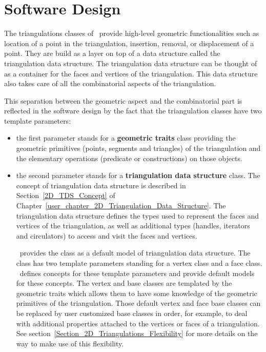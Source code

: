 \section{Software Design\label{Section_2D_Triangulations_Software_Design}}

The triangulations  classes of \cgal\  
provide high-level geometric functionalities
such as location of a point in the triangulation, insertion, removal, or displacement of a point.
They are build as a layer on top of a data structure
called the triangulation data structure.
The triangulation data structure   can be thought 
of as a container for the faces and vertices of the triangulation.
This data structure  also takes care
of all the combinatorial aspects of the triangulation.

This separation between the
geometric aspect and the combinatorial part
is reflected in the software design by the fact
that the triangulation classes have two template parameters:

\begin{itemize}
\item {} the first parameter stands for a
\textbf{geometric traits} class providing 
the geometric primitives (points, segments and triangles) 
of  the triangulation and the elementary
operations (predicate or constructions) on those objects.

\item {} the second parameter stands for a
\textbf{triangulation data structure} class. The concept
of triangulation data structure is described in
 Section~\ref{2D_TDS_Concept} of
Chapter~\ref{user_chapter_2D_Triangulation_Data_Structure}.
The triangulation data structure defines the types
used to represent the faces and vertices of the triangulation,
as well as additional types (handles, iterators and circulators)
to access and visit the faces and vertices.

\cgal\ provides the class 
as a  default model of triangulation data structure.
The class \ccc{Triangulation_data_structure_2<Vb,Fb>}
has two template parameters standing for
a vertex class and a face class.
\cgal\ defines concepts 
for these template parameters
and provide default models for these concepts.
The vertex and base classes are templated by the geometric
traits which allows them to have some knowledge of the geometric
primitives of the triangulation. 
Those default vertex and  face base classes
can be replaced by 
user customized base classes in order, for example, to deal
with additional properties attached to the vertices or faces
of a triangulation. See section~\ref{Section_2D_Triangulations_Flexibility}
for more details on the way to make use of this flexibility.
\end{itemize}

